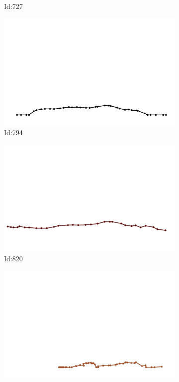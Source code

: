 \documentclass[12pt,twoside]{report}
\begin{document}
\begin{figure}
\begin{subfigure}[b]{0.20\textwidth}
\caption{Id:727}
\end{subfigure}
\begin{subfigure}[b]{0.20\textwidth}
\centering
\includegraphics[width=\textwidth]{../trajectories/794.png}
\caption{Id:794}
\end{subfigure}
\begin{subfigure}[b]{0.20\textwidth}
\centering
\includegraphics[width=\textwidth]{../trajectories/820.png}
\caption{Id:820}
\end{subfigure}
\begin{subfigure}[b]{0.20\textwidth}
\centering
\includegraphics[width=\textwidth]{../trajectories/838.png}

\end{subfigure}
\end{figure}
\end{document}
